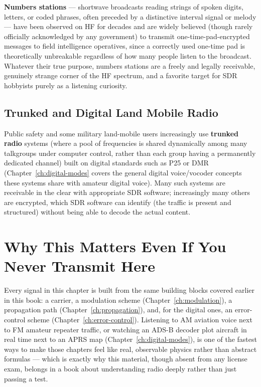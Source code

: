 \textbf{Numbers stations} --- shortwave broadcasts reading strings of
spoken digits, letters, or coded phrases, often preceded by a
distinctive interval signal or melody --- have been observed on HF for
decades and are widely believed (though rarely officially acknowledged
by any government) to transmit one-time-pad-encrypted messages to field
intelligence operatives, since a correctly used one-time pad is
theoretically unbreakable regardless of how many people listen to the
broadcast. Whatever their true purpose, numbers stations are a
freely and legally receivable, genuinely strange corner of the HF
spectrum, and a favorite target for SDR hobbyists purely as a listening
curiosity.

\subsection{Trunked and Digital Land Mobile Radio}

Public safety and some military land-mobile users increasingly use
\textbf{trunked radio} systems (where a pool of frequencies is shared
dynamically among many talkgroups under computer control, rather than
each group having a permanently dedicated channel) built on digital
standards such as P25 or DMR (Chapter~\ref{ch:digital-modes} covers the
general digital voice/vocoder concepts these systems share with amateur
digital voice). Many such systems are receivable in the clear with
appropriate SDR software; increasingly many others are encrypted, which
SDR software can identify (the traffic is present and structured) without
being able to decode the actual content.

\section{Why This Matters Even If You Never Transmit Here}

\begin{keyidea}
Every signal in this chapter is built from the same building blocks
covered earlier in this book: a carrier, a modulation scheme
(Chapter~\ref{ch:modulation}), a propagation path
(Chapter~\ref{ch:propagation}), and, for the digital ones, an error-control
scheme (Chapter~\ref{ch:error-control}). Listening to AM aviation voice
next to FM amateur repeater traffic, or watching an ADS-B decoder plot
aircraft in real time next to an APRS map (Chapter~\ref{ch:digital-modes}),
is one of the fastest ways to make those chapters feel like real,
observable physics rather than abstract formulas --- which is exactly
why this material, though absent from any license exam, belongs in a
book about understanding radio deeply rather than just passing a test.
\end{keyidea}

